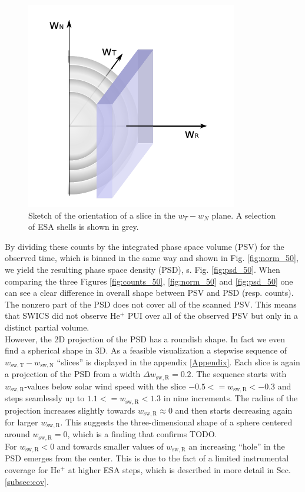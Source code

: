 \begin{figure}[h]
	\includegraphics[width=.5\textwidth]{Figures/sketch_slice_R2.pdf}
	\centering
	\caption{Sketch of the orientation of a slice in the $w_T - w_N$ plane. A selection of ESA shells is shown in grey.}
	\label{fig:sketch_slice_R}
\end{figure}
By dividing these counts by the integrated phase space volume (PSV) for the observed time, which is binned in the same way and shown in Fig. \ref{fig:norm_50}, we yield the resulting phase space density (PSD), s. Fig. \ref{fig:psd_50}. When comparing the three Figures \ref{fig:counts_50}, \ref{fig:norm_50} and \ref{fig:psd_50} one can see a clear difference in overall shape between PSV and PSD (resp. counts). The nonzero part of the PSD does not cover all of the scanned PSV. This means that SWICS did not observe $\mathrm{He^{+}}$ PUI over all of the observed PSV but only in a distinct partial volume.\\ 
However, the 2D projection of the PSD has a roundish shape. In fact we even find a spherical shape in 3D. As a feasible visualization a stepwise sequence of $w_\mathrm{sw,T} - w_\mathrm{sw,N}$ ``slices'' is displayed in the appendix \ref{Appendix}. Each slice is again a projection of the PSD from a width $\Delta w_\mathrm{sw,R} = 0.2$. The sequence starts with $w_\mathrm{sw,R}$-values below solar wind speed with the slice $-0.5 <= w_\mathrm{sw,R} < -0.3$ and steps seamlessly up to $1.1 <= w_\mathrm{sw,R} < 1.3$ in nine increments. The radius of the projection increases slightly towards $ w_\mathrm{sw,R} \approx 0$ and then starts decreasing again for larger $w_\mathrm{sw,R}$. This suggests the three-dimensional shape of a sphere centered around $w_\mathrm{sw,R} = 0$, which is a finding that confirms TODO. \\
For $w_\mathrm{sw,R} < 0$ and towards smaller values of $w_\mathrm{sw,R}$ an increasing ``hole'' in the PSD emerges from the center. This is due to the fact of a limited instrumental coverage for $\mathrm{He^{+}}$ at higher ESA steps, which is described in more detail in Sec. \ref{subsec:cov}. \\
